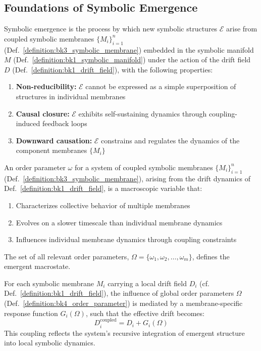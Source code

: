 \subsection{Foundations of Symbolic Emergence} \label{subsec:bk4_foundations_symbolic_emergence}
\begin{definition}
\label{definition:bk4_symbolic_emergence}
Symbolic emergence is the process by which new symbolic structures $\mathcal{E}$ arise from coupled symbolic membranes $\{M_i\}_{i=1}^{n}$ (Def.~\ref{definition:bk3_symbolic_membrane}) embedded in the symbolic manifold $M$ (Def.~\ref{definition:bk1_symbolic_manifold}) under the action of the drift field $D$ (Def.~\ref{definition:bk1_drift_field}), with the following properties:
\begin{enumerate}
    \item \textbf{Non-reducibility:} $\mathcal{E}$ cannot be expressed as a simple superposition of structures in individual membranes
    \item \textbf{Causal closure:} $\mathcal{E}$ exhibits self-sustaining dynamics through coupling-induced feedback loops
    \item \textbf{Downward causation:} $\mathcal{E}$ constrains and regulates the dynamics of the component membranes $\{M_i\}$
\end{enumerate}
\end{definition}
\begin{definition}
\label{definition:bk4_order_parameter}
An order parameter $\omega$ for a system of coupled symbolic membranes $\{M_i\}_{i=1}^{n}$ (Def.~\ref{definition:bk3_symbolic_membrane}), arising from the drift dynamics of Def.~\ref{definition:bk1_drift_field}, is a macroscopic variable that:
\begin{enumerate}
    \item Characterizes collective behavior of multiple membranes
    \item Evolves on a slower timescale than individual membrane dynamics
    \item Influences individual membrane dynamics through coupling constraints
\end{enumerate}
The set of all relevant order parameters, $\Omega = \{\omega_1, \omega_2, \ldots, \omega_m\}$, defines the emergent macrostate.
\end{definition}
\begin{axiom}
\label{axiom:bk4_membrane_coupling_response}
For each symbolic membrane \( M_i \) carrying a local drift field $D_i$ (cf. Def.~\ref{definition:bk1_drift_field}), the influence of global order parameters \( \Omega \) (Def.~\ref{definition:bk4_order_parameter}) is mediated by a membrane-specific response function \( G_i(\Omega) \), such that the effective drift becomes:
\[
D_i^{\text{coupled}} = D_i + G_i(\Omega)
\]
This coupling reflects the system's recursive integration of emergent structure into local symbolic dynamics.
\end{axiom}

